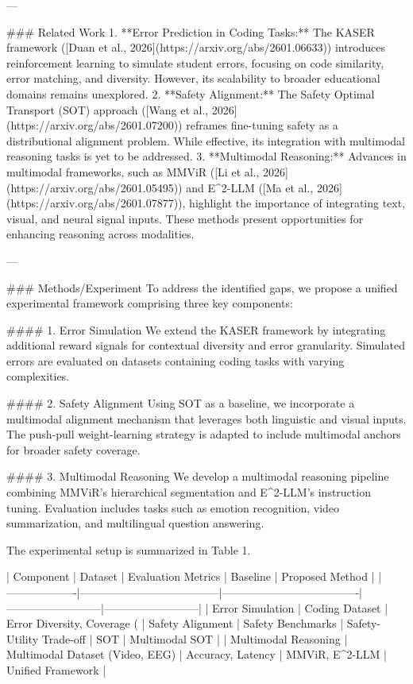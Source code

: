 ---

### Related Work  
1. **Error Prediction in Coding Tasks:** The KASER framework ([Duan et al., 2026](https://arxiv.org/abs/2601.06633)) introduces reinforcement learning to simulate student errors, focusing on code similarity, error matching, and diversity. However, its scalability to broader educational domains remains unexplored.  
2. **Safety Alignment:** The Safety Optimal Transport (SOT) approach ([Wang et al., 2026](https://arxiv.org/abs/2601.07200)) reframes fine-tuning safety as a distributional alignment problem. While effective, its integration with multimodal reasoning tasks is yet to be addressed.  
3. **Multimodal Reasoning:** Advances in multimodal frameworks, such as MMViR ([Li et al., 2026](https://arxiv.org/abs/2601.05495)) and E^2-LLM ([Ma et al., 2026](https://arxiv.org/abs/2601.07877)), highlight the importance of integrating text, visual, and neural signal inputs. These methods present opportunities for enhancing reasoning across modalities.  

---

### Methods/Experiment  
To address the identified gaps, we propose a unified experimental framework comprising three key components:  

#### 1. Error Simulation  
We extend the KASER framework by integrating additional reward signals for contextual diversity and error granularity. Simulated errors are evaluated on datasets containing coding tasks with varying complexities.  

#### 2. Safety Alignment  
Using SOT as a baseline, we incorporate a multimodal alignment mechanism that leverages both linguistic and visual inputs. The push-pull weight-learning strategy is adapted to include multimodal anchors for broader safety coverage.  

#### 3. Multimodal Reasoning  
We develop a multimodal reasoning pipeline combining MMViR’s hierarchical segmentation and E^2-LLM’s instruction tuning. Evaluation includes tasks such as emotion recognition, video summarization, and multilingual question answering.  

The experimental setup is summarized in Table 1.  

| Component         | Dataset                              | Evaluation Metrics                  | Baseline                  | Proposed Method         |  
|-------------------|--------------------------------------|-------------------------------------|--------------------------|--------------------------|  
| Error Simulation  | Coding Dataset                      | Error Diversity, Coverage (%
| Safety Alignment  | Safety Benchmarks                   | Safety-Utility Trade-off           | SOT                      | Multimodal SOT          |  
| Multimodal Reasoning | Multimodal Dataset (Video, EEG)   | Accuracy, Latency                  | MMViR, E^2-LLM           | Unified Framework        |  

